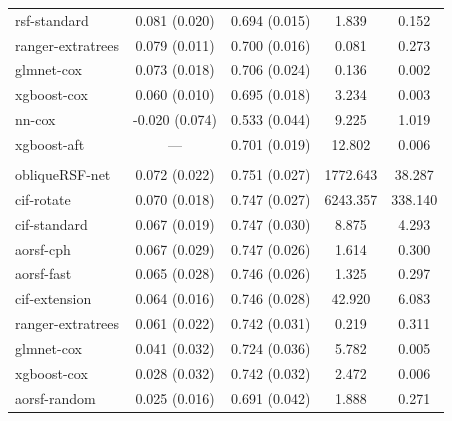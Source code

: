 \documentclass[12pt]{article}\usepackage[]{graphicx}\usepackage[]{xcolor}
\newenvironment{knitrout}{}{} %
\begin{document}
\begin{knitrout}
\begin{longtable}[t]{lcccc}
\hspace{1em}rsf-standard & 0.081 (0.020) & 0.694 (0.015) & 1.839 & 0.152\\
\hspace{1em}ranger-extratrees & 0.079 (0.011) & 0.700 (0.016) & 0.081 & 0.273\\
\hspace{1em}glmnet-cox & 0.073 (0.018) & 0.706 (0.024) & 0.136 & 0.002\\
\hspace{1em}xgboost-cox & 0.060 (0.010) & 0.695 (0.018) & 3.234 & 0.003\\
\hspace{1em}nn-cox & -0.020 (0.074) & 0.533 (0.044) & 9.225 & 1.019\\
\hspace{1em}xgboost-aft & --- & 0.701 (0.019) & 12.802 & 0.006\\
\addlinespace[0.3em]
\multicolumn{5}{l}{\textit{\textbf{Early breast cancer; recurrence or death, n = 614, p = 1692}}}\\
\hline
\hspace{1em}obliqueRSF-net & 0.072 (0.022) & 0.751 (0.027) & 1772.643 & 38.287\\
\hspace{1em}cif-rotate & 0.070 (0.018) & 0.747 (0.027) & 6243.357 & 338.140\\
\hspace{1em}cif-standard & 0.067 (0.019) & 0.747 (0.030) & 8.875 & 4.293\\
\hspace{1em}aorsf-cph & 0.067 (0.029) & 0.747 (0.026) & 1.614 & 0.300\\
\hspace{1em}aorsf-fast & 0.065 (0.028) & 0.746 (0.026) & 1.325 & 0.297\\
\hspace{1em}cif-extension & 0.064 (0.016) & 0.746 (0.028) & 42.920 & 6.083\\
\hspace{1em}ranger-extratrees & 0.061 (0.022) & 0.742 (0.031) & 0.219 & 0.311\\
\hspace{1em}glmnet-cox & 0.041 (0.032) & 0.724 (0.036) & 5.782 & 0.005\\
\hspace{1em}xgboost-cox & 0.028 (0.032) & 0.742 (0.032) & 2.472 & 0.006\\
\hspace{1em}aorsf-random & 0.025 (0.016) & 0.691 (0.042) & 1.888 & 0.271\\

\end{longtable}
\end{knitrout}
\end{document}

